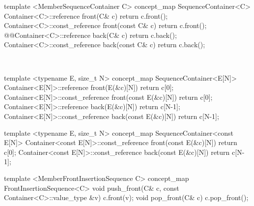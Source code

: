 \documentclass[american,twoside]{book}
\newcommand{\resetcolor}{\textcolor{addclr}{}}
\begin{document}
\begin{itemdescr}
\pnum 
{}
\end{itemdescr}


\begin{itemdecl}
template <MemberSequenceContainer C> 
concept_map SequenceContainer<C> {
  Container<C>::reference       front(C& c)       { return c.front(); }
  Container<C>::const_reference front(const C& c) { return c.front(); }
  @\resetcolor{}@Container<C>::reference       back(C& c)        { return c.back(); }
  Container<C>::const_reference back(const C& c)  { return c.back(); }
}			
\end{itemdecl}

\begin{itemdescr}
\pnum 
{}
\\
\end{itemdescr}

\begin{itemdecl}
template <typename E, size_t N>
concept_map SequenceContainer<E[N]> {
  Container<E[N]>::reference       front(E(&c)[N])       { return c[0]; }
  Container<E[N]>::const_reference front(const E(&c)[N]) { return c[0]; }
  Container<E[N]>::reference       back(E(&c)[N])        { return c[N-1]; }
  Container<E[N]>::const_reference back(const E(&c)[N])  { return c[N-1]; }
}
\end{itemdecl}

\begin{itemdecl}
template <typename E, size_t N>
concept_map SequenceContainer<const E[N]> {
  Container<const E[N]>::const_reference front(const E(&c)[N]) { return c[0]; }
  Container<const E[N]>::const_reference back(const E(&c)[N])  { return c[N-1]; }
}
\end{itemdecl}

\begin{itemdescr}
\pnum 
{}
\end{itemdescr}

\begin{itemdecl}
template <MemberFrontInsertionSequence C> 
concept_map FrontInsertionSequence<C> {
  void push_front(C& c, const Container<C>::value_type &v)   { c.front(v); }
  void pop_front(C& c)                                       { c.pop_front(); }
}			
\end{itemdecl}
\end{document}
